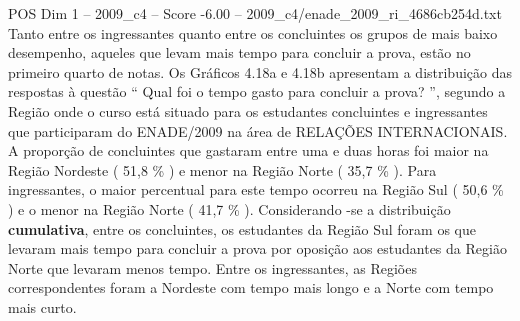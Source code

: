 \begin{textsample}{POS Dim 1 – 2009\_c4 – Score -6.00 – 2009\_c4/enade\_2009\_ri\_4686cb254d.txt}
Tanto entre os ingressantes quanto entre os concluintes os grupos de mais baixo desempenho, aqueles que levam mais tempo para concluir a prova, estão no primeiro quarto de notas.
Os Gráficos 4.18a e 4.18b apresentam a distribuição das respostas à questão “ Qual foi o tempo gasto para concluir a prova? ”, segundo a Região onde o curso está situado para os estudantes concluintes e ingressantes que participaram do ENADE/2009 na área de RELAÇÕES INTERNACIONAIS.
A proporção de concluintes que gastaram entre uma e duas horas foi maior na Região Nordeste ( 51,8 \% ) e menor na Região Norte ( 35,7 \% ).
Para ingressantes, o maior percentual para este tempo ocorreu na Região Sul ( 50,6 \% ) e o menor na Região Norte ( 41,7 \% ).
Considerando -se a distribuição \textbf{cumulativa}, entre os concluintes, os estudantes da Região Sul foram os que levaram mais tempo para concluir a prova por oposição aos estudantes da Região Norte que levaram menos tempo.
Entre os ingressantes, as Regiões correspondentes foram a Nordeste com tempo mais longo e a Norte com tempo mais curto.

\end{textsample}

